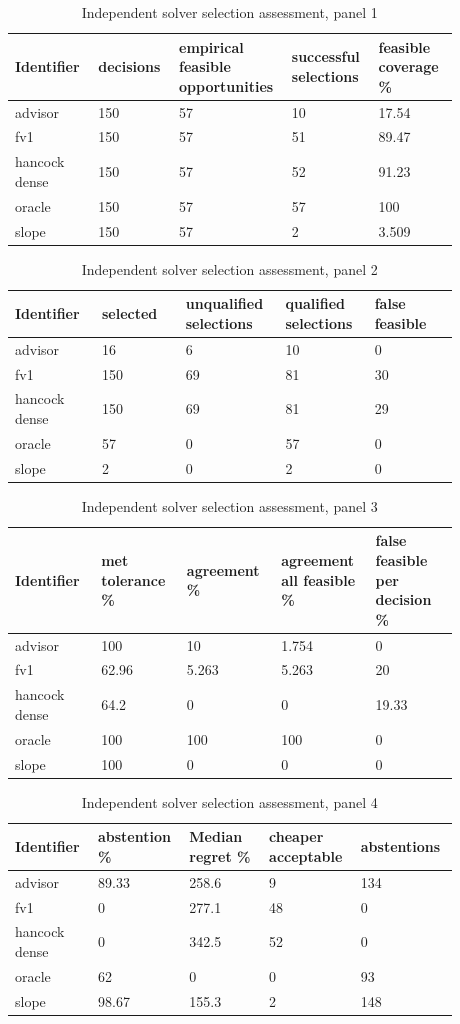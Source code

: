 \begingroup
\small
\setlength{\tabcolsep}{2pt}
\begin{longtable}{p{0.1760\linewidth}p{0.1760\linewidth}p{0.1760\linewidth}p{0.1760\linewidth}p{0.1760\linewidth}}
\caption{Independent solver selection assessment, panel 1}\\
\hline
Identifier & decisions & empirical feasible opportunities & successful selections & feasible coverage \% \\
\hline\endhead
advisor & 150 & 57 & 10 & 17.54 \\
fv1 & 150 & 57 & 51 & 89.47 \\
hancock dense & 150 & 57 & 52 & 91.23 \\
oracle & 150 & 57 & 57 & 100 \\
slope & 150 & 57 & 2 & 3.509 \\
\end{longtable}
\begin{longtable}{p{0.1760\linewidth}p{0.1760\linewidth}p{0.1760\linewidth}p{0.1760\linewidth}p{0.1760\linewidth}}
\caption{Independent solver selection assessment, panel 2}\\
\hline
Identifier & selected & unqualified selections & qualified selections & false feasible \\
\hline\endhead
advisor & 16 & 6 & 10 & 0 \\
fv1 & 150 & 69 & 81 & 30 \\
hancock dense & 150 & 69 & 81 & 29 \\
oracle & 57 & 0 & 57 & 0 \\
slope & 2 & 0 & 2 & 0 \\
\end{longtable}
\begin{longtable}{p{0.1760\linewidth}p{0.1760\linewidth}p{0.1760\linewidth}p{0.1760\linewidth}p{0.1760\linewidth}}
\caption{Independent solver selection assessment, panel 3}\\
\hline
Identifier & met tolerance \% & agreement \% & agreement all feasible \% & false feasible per decision \% \\
\hline\endhead
advisor & 100 & 10 & 1.754 & 0 \\
fv1 & 62.96 & 5.263 & 5.263 & 20 \\
hancock dense & 64.2 & 0 & 0 & 19.33 \\
oracle & 100 & 100 & 100 & 0 \\
slope & 100 & 0 & 0 & 0 \\
\end{longtable}
\begin{longtable}{p{0.1760\linewidth}p{0.1760\linewidth}p{0.1760\linewidth}p{0.1760\linewidth}p{0.1760\linewidth}}
\caption{Independent solver selection assessment, panel 4}\\
\hline
Identifier & abstention \% & Median regret \% & cheaper acceptable & abstentions \\
\hline\endhead
advisor & 89.33 & 258.6 & 9 & 134 \\
fv1 & 0 & 277.1 & 48 & 0 \\
hancock dense & 0 & 342.5 & 52 & 0 \\
oracle & 62 & 0 & 0 & 93 \\
slope & 98.67 & 155.3 & 2 & 148 \\
\end{longtable}
